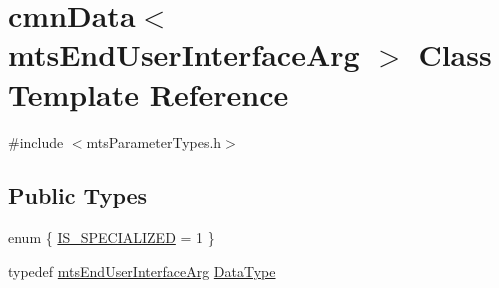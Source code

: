 \hypertarget{classcmn_data_3_01mts_end_user_interface_arg_01_4}{}\section{cmn\+Data$<$ mts\+End\+User\+Interface\+Arg $>$ Class Template Reference}
\label{classcmn_data_3_01mts_end_user_interface_arg_01_4}


{\ttfamily \#include $<$mts\+Parameter\+Types.\+h$>$}

\subsection*{Public Types}
\begin{DoxyCompactItemize}
\item 
enum \{ \hyperlink{classcmn_data_3_01mts_end_user_interface_arg_01_4_a4e45c72ef21e076e17b51e2c510d8195a405e54b42dfa3b3aed15fdfcdc9b73dd}{I\+S\+\_\+\+S\+P\+E\+C\+I\+A\+L\+I\+Z\+E\+D} = 1
 \}
\item 
typedef \hyperlink{classmts_end_user_interface_arg}{mts\+End\+User\+Interface\+Arg} \hyperlink{classcmn_data_3_01mts_end_user_interface_arg_01_4_aedf4f6543ddf0d9a93eeb4825c17a9e8}{Data\+Type}
\end{DoxyCompactItemize}
